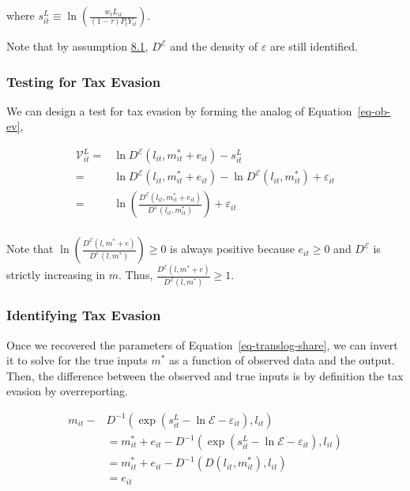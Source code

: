 \documentclass[
  12pt]{article}
\theoremstyle{definition}
\theoremstyle{remark}
\begin{document}
where
\(s_{it}^{L} \equiv\ln\left(\frac{w_t L_{it}}{(1-\tau)P_{t}Y_{it}}\right)\).

Note that by assumption \hyperref[ass-non-ev]{8.1}, \(D^{\mathcal{E}}\)
and the density of \(\varepsilon\) are still identified.

\subsubsection{Testing for Tax Evasion}\label{testing-for-tax-evasion}

We can design a test for tax evasion by forming the analog of
Equation~\ref{eq-ob-ev},

\[
\begin{aligned}
\mathcal{V}_{it}^{L} =&\ln D^{\mathcal{E}}(l_{it},m_{it}^*+e_{it})-s_{it}^L\\
    =&\ln D^{\mathcal{E}}(l_{it},m_{it}^*+e_{it})-\ln D^{\mathcal{E}}(l_{it},m_{it}^*)+\varepsilon_{it}\\
    =&\ln\left(\frac{D^{\mathcal{E}}(l_{it},m_{it}^*+e_{it})}{D^{\mathcal{E}}(l_{it},m_{it}^*)}\right)+\varepsilon_{it}\\
\end{aligned}
\]

Note that
\(\ln\left(\frac{D^{\mathcal{E}}(l,m^*+e)}{D^{\mathcal{E}}(l,m^*)}\right)\ge0\)
is always positive because \(e_{it}\ge0\) and \(D^{\mathcal{E}}\) is
strictly increasing in \(m\). Thus,
\(\frac{D^{\mathcal{E}}(l,m^*+e)}{D^{\mathcal{E}}(l,m^*)}\ge1\).

\subsubsection{Identifying Tax Evasion}\label{identifying-tax-evasion-1}

Once we recovered the parameters of Equation~\ref{eq-translog-share}, we
can invert it to solve for the true inputs \(m^*\) as a function of
observed data and the output. Then, the difference between the observed
and true inputs is by definition the tax evasion by overreporting.

\[
\begin{aligned}
    m_{it}-&D^{-1}(\exp(s^L_{it}-\ln\mathcal{E}-\varepsilon_{it}),l_{it})\\
    &= m_{it}^*+e_{it} -D^{-1}(\exp(s^L_{it}-\ln\mathcal{E}-\varepsilon_{it}),l_{it})\\
    &= m_{it}^*+e_{it} -D^{-1}(D(l_{it},m_{it}^*),l_{it})\\
    &=e_{it}
\end{aligned}
\]
\end{document}
